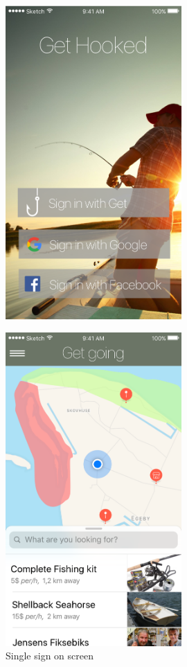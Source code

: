 \begin{figure}[H]  
\centering
\begin{minipage}{0.5\textwidth}
  	\hfill
  	\begin{minipage}[t]{0.47\textwidth}
  	  	\centering
  	  	\includegraphics[width=0.6\textwidth]{images/Introscreen.png}
  	  	\label{fig:f1}
  	  	\caption{Single sign on screen}
  	\end{minipage}
  	\hfill
  	\begin{minipage}[t]{0.47\textwidth}
  	  	\centering
  	  	\includegraphics[width=0.6\textwidth]{images/Map.png}

\end{minipage}
\end{minipage}
\end{figure}
